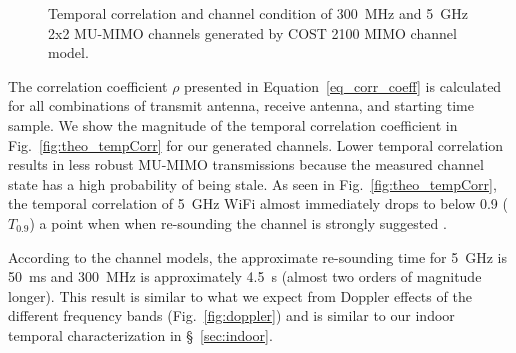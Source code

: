 \begin{figure}[ht]
	\centering
  	\caption{Temporal correlation and channel condition of 300~MHz and 5~GHz 2x2 MU-MIMO channels generated by COST 2100 MIMO channel model. \label{fig:corr}} 
\end{figure}
 
	The correlation coefficient $\rho$ presented in Equation~\ref{eq_corr_coeff} is calculated for all combinations of transmit antenna, receive antenna, and starting time sample.
	We show the magnitude of the temporal correlation coefficient in Fig.~\ref{fig:theo_tempCorr} for our generated channels.  
	Lower temporal correlation results in less robust MU-MIMO transmissions because the measured channel state has a high probability of being stale.
	As seen in Fig.~\ref{fig:theo_tempCorr}, the temporal correlation of 5~GHz WiFi almost immediately drops to below 0.9 ($T_{0.9}$) a point when when re-sounding the channel is strongly suggested \cite{breit2009coherence}. 

According to the channel models, the approximate re-sounding time for 5~GHz is 50~ms and 300~MHz is approximately 4.5~s (almost two orders of magnitude longer). 
This result is similar to what we expect from Doppler effects of the different frequency bands (Fig.~\ref{fig:doppler}) and is similar to our indoor temporal characterization in \S~\ref{sec:indoor}.

